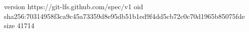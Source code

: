 version https://git-lfs.github.com/spec/v1
oid sha256:70314958f3ca9c45a73359d8e95db51b1ed9f4dd5cb72c0c70d1965b85075fde
size 41714
